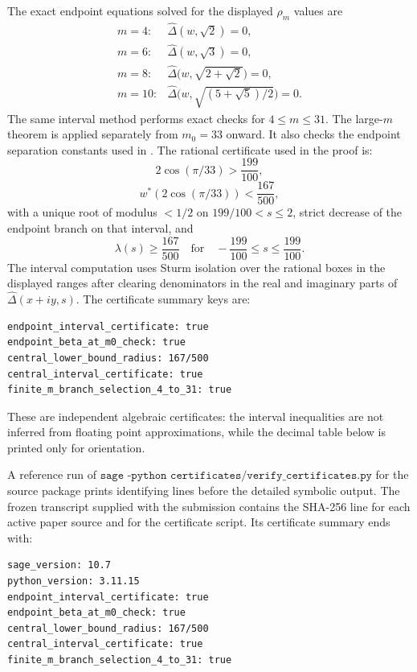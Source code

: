 \begin{enumerate}[label=(\alph*)]
    The exact endpoint equations solved for the displayed \(\rho_m\)
    values are
    \[
    \begin{array}{ll}
      m=4:  & \widehat\Delta(w,\sqrt2)=0,\\
      m=6:  & \widehat\Delta(w,\sqrt3)=0,\\
      m=8:  & \widehat\Delta\bigl(w,\sqrt{2+\sqrt2}\bigr)=0,\\
      m=10: & \widehat\Delta\bigl(w,\sqrt{(5+\sqrt5)/2}\bigr)=0.
    \end{array}
    \]
    The same interval method performs exact checks for
    \(4\le m\le31\). The large-\(m\) theorem is applied separately
    from \(m_0=33\) onward. It also checks the endpoint separation
    constants used in . The
    rational certificate used in the proof is:
\[
      2\cos(\pi/33)>\frac{199}{100},
\]
\[
      w^*(2\cos(\pi/33))<\frac{167}{500},
\]
with a unique root of modulus \(<1/2\) on
\(199/100<s\le2\), strict decrease of the endpoint branch on that
interval, and
\[
      \lambda(s)\ge\frac{167}{500}
      \quad\text{for}\quad
      -\frac{199}{100}\le s\le\frac{199}{100}.
\]
    The interval computation uses Sturm isolation over the rational
    boxes in the displayed ranges after clearing denominators in the
    real and imaginary parts of
    \(\widehat\Delta(x+iy,s)\). The certificate summary keys are:
\begin{verbatim}
endpoint_interval_certificate: true
endpoint_beta_at_m0_check: true
central_lower_bound_radius: 167/500
central_interval_certificate: true
finite_m_branch_selection_4_to_31: true
\end{verbatim}
    These are independent algebraic certificates: the interval
    inequalities are not inferred from floating point approximations,
    while the decimal table below is printed only for orientation.

    A reference run of
    \(\texttt{sage -python certificates/verify\_certificates.py}\)
    for the source package prints identifying lines before the detailed
    symbolic output.  The frozen transcript supplied with the submission
    contains the SHA-256 line for each active paper source and for the
    certificate script.  Its certificate summary ends with:
\begin{verbatim}
sage_version: 10.7
python_version: 3.11.15
endpoint_interval_certificate: true
endpoint_beta_at_m0_check: true
central_lower_bound_radius: 167/500
central_interval_certificate: true
finite_m_branch_selection_4_to_31: true
\end{verbatim}


\end{enumerate}
